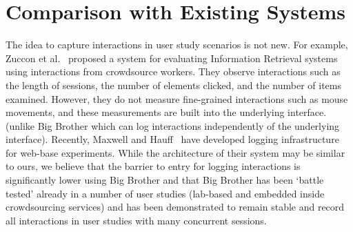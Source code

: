 \section{Comparison with Existing Systems}

The idea to capture interactions in user study scenarios is not new. For example, Zuccon et al.~\cite{zuccon2013crowdsourcing} proposed a system for evaluating Information Retrieval systems using interactions from crowdsource workers. They observe interactions such as the length of sessions, the number of elements clicked, and the number of items examined. However, they do not measure fine-grained interactions such as mouse movements, and these measurements are built into the underlying interface. (unlike Big Brother which can log interactions independently of the underlying interface). Recently, Maxwell and Hauff~\cite{maxwell2021logui} have developed logging infrastructure for web-base experiments. While the architecture of their system may be similar to ours, we believe that the barrier to entry for logging interactions is significantly lower using Big Brother and that Big Brother has been `battle tested' already in a number of user studies (lab-based and embedded inside crowdsourcing services) and has been demonstrated to remain stable and record all interactions in user studies with many concurrent sessions.

